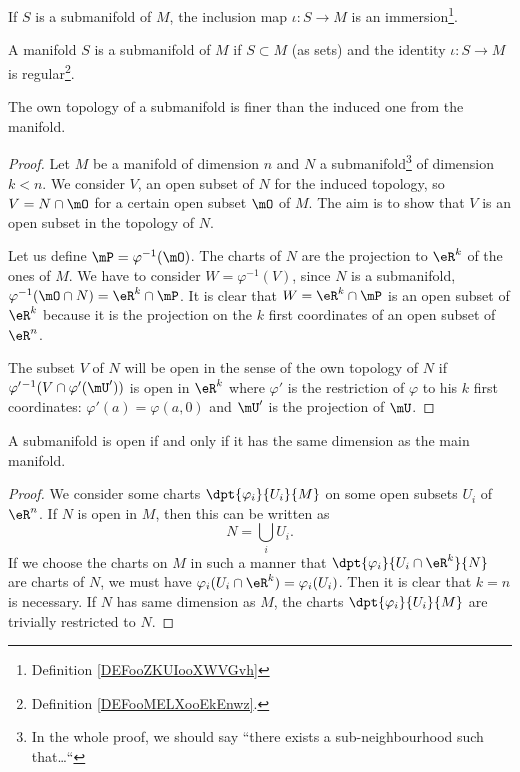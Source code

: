\begin{proposition}       \label{PROPooEWUCooTStAvb}
	If \( S\) is a submanifold of \( M\), the inclusion map \( \iota\colon S \to M\) is an immersion\footnote{Definition \ref{DEFooZKUIooXWVGvh}}.
\end{proposition}

\begin{proposition}     \label{PROPooZACHooCNgLSl}
	A manifold \( S\) is a submanifold of \( M\) if \( S\subset M\) (as sets) and the identity \( \iota\colon S\to M\) is regular\footnote{Definition \ref{DEFooMELXooEkEnwz}.}.
\end{proposition}

\begin{proposition}\label{prop:topo_sub_manif}
	The own topology of a submanifold is finer than the induced one from the manifold.
\end{proposition}

\begin{proof}
	Let $M$ be a manifold of dimension $n$ and $N$ a submanifold\footnote{In the whole proof, we should say ``there exists a sub-neighbourhood such that\ldots``} of dimension $k<n$. We consider $V$, an open subset of $N$ for the induced topology, so $V=N\cap\mO$ for a certain open subset $\mO$ of $M$. The aim is to show that $V$ is an open subset in the topology of $N$.

	Let us define $\mP=\varphi^{-1}(\mO)$.  The charts of $N$ are the projection to $\eR^k$ of the ones of $M$. We have to consider $W=\varphi^{-1}(V)$, since $N$ is a submanifold, $\varphi^{-1}(\mO\cap N)=\eR^k\cap\mP$. It is clear that $W=\eR^k\cap\mP$ is an open subset of $\eR^k$ because it is the projection on the $k$ first coordinates of an open subset of $\eR^n$.

	The subset $V$ of $N$ will be open in the sense of the own topology of $N$ if $\varphi'{}^{-1}(V\cap\varphi'(\mU'))$ is open in $\eR^k$ where $\varphi'$ is the restriction of $\varphi$ to his $k$ first coordinates: $\varphi'(a)=\varphi(a,0)$ and $\mU'$ is the projection of $\mU$.
\end{proof}


\begin{proposition}\label{prop:subvar_ouvert}
	A submanifold is open if and only if it has the same dimension as the main manifold.
\end{proposition}

\begin{proof}
	We consider some charts $\dpt{\varphi_i}{U_i}{M}$ on some open subsets $U_i$ of $\eR^n$. If $N$ is open in $M$, then this can be written as
	\[
		N=\bigcup_iU_i.
	\]
	If we choose the charts on $M$ in such a manner that $\dpt{\varphi_i}{U_i\cap \eR^k}{N}$ are charts of $N$, we must have $\varphi_i(U_i\cap\eR^k)=\varphi_i(U_i)$. Then it is clear that $k=n$ is necessary.
	If $N$ has same dimension as $M$, the charts $\dpt{\varphi_i}{U_i}{M}$ are trivially restricted to $N$.
\end{proof}

